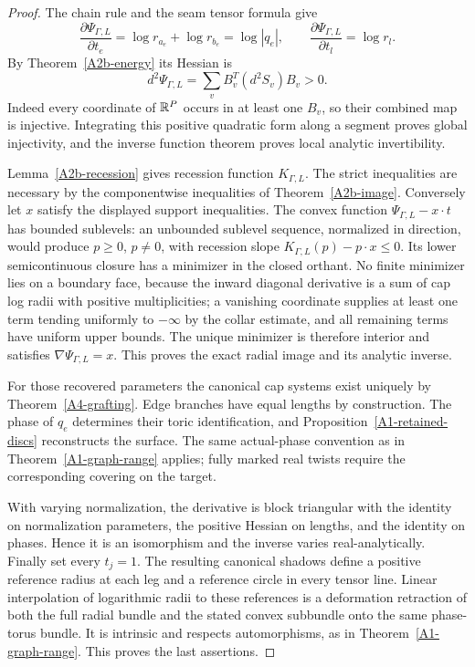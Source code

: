 \begin{proof}
The chain rule and the seam tensor formula give
\[
 \frac{\partial\Psi_{\Gamma,L}}{\partial t_e}
       =\log r_{a_e}+\log r_{b_e}=\log|q_e|,
 \qquad
 \frac{\partial\Psi_{\Gamma,L}}{\partial t_l}=\log r_l.
\]
By Theorem~\ref{A2b-energy} its Hessian is
\[
 d^2\Psi_{\Gamma,L}=
       \sum_v B_v^T(d^2S_v)B_v>0.
\]
Indeed every coordinate of ${\mathbb{R}}^P$ occurs in at least one $B_v$,
so their combined map is injective. Integrating this positive
quadratic form along a segment proves global injectivity, and
the inverse function theorem proves local analytic invertibility.

Lemma~\ref{A2b-recession} gives recession function
$K_{\Gamma,L}$. The strict inequalities are necessary by the
componentwise inequalities of Theorem~\ref{A2b-image}. Conversely
let $x$ satisfy the displayed support inequalities. The convex
function $\Psi_{\Gamma,L}-x\cdot t$ has bounded sublevels: an
unbounded sublevel sequence, normalized in direction, would
produce $p\geq0$, $p\ne0$, with recession slope
$K_{\Gamma,L}(p)-p\cdot x\leq0$. Its lower semicontinuous closure
has a minimizer in the closed orthant. No finite minimizer lies
on a boundary face, because the inward diagonal derivative is a
sum of cap log radii with positive multiplicities; a vanishing
coordinate supplies at least one term tending uniformly to
$-\infty$ by the collar estimate, and all remaining terms have
uniform upper bounds. The unique minimizer is therefore interior
and satisfies $\nabla\Psi_{\Gamma,L}=x$. This proves the exact
radial image and its analytic inverse.

For those recovered parameters the canonical cap systems exist
uniquely by Theorem~\ref{A4-grafting}. Edge branches have equal
lengths by construction. The phase of $q_e$ determines their toric
identification, and Proposition~\ref{A1-retained-discs} reconstructs
the surface. The same actual-phase convention as in
Theorem~\ref{A1-graph-range} applies; fully marked real twists
require the corresponding covering on the target.

With varying normalization, the derivative is block triangular
with the identity on normalization parameters, the positive
Hessian on lengths, and the identity on phases. Hence it is an
isomorphism and the inverse varies real-analytically. Finally set
every $t_j=1$. The resulting canonical shadows define a positive
reference radius at each leg and a reference circle in every
tensor line. Linear interpolation of logarithmic radii to these
references is a deformation retraction of both the full radial
bundle and the stated convex subbundle onto the same phase-torus
bundle. It is intrinsic and respects automorphisms, as in
Theorem~\ref{A1-graph-range}. This proves the last assertions.
\end{proof}

